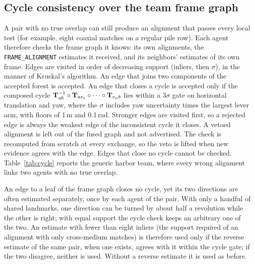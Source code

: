 \subsection{Cycle consistency over the team frame graph}
A pair with no true overlap can still produce an alignment that passes every local test
(for example, eight coaxial matches on a regular pile row). Each agent therefore checks the frame graph it knows:
its own alignments, the \texttt{FRAME\_ALIGNMENT} estimates it received, and its neighbors'
estimates of its own frame. Edges are visited in order of decreasing support (inliers, then
$\sigma$), in the manner of Kruskal's algorithm. An edge that joins two components of the accepted forest is accepted.
An edge that closes a cycle is accepted only if the composed cycle
$\mathbf{T}_{ab}^{-1}\circ\mathbf{T}_{ac_1}\circ\cdots\circ\mathbf{T}_{c_nb}$ lies within a $3\sigma$ gate on
horizontal translation and yaw, where the $\sigma$ includes yaw uncertainty times the largest lever arm, with floors of
1\,m and 0.1\,rad. Stronger edges are visited first, so a rejected edge is always the weakest edge of the
inconsistent cycle it closes. A vetoed alignment is left out of the fused graph and not advertised. The check is
recomputed from scratch at every exchange, so the veto is lifted when new evidence agrees with
the edge. Edges that close no cycle cannot be checked. Table~\ref{tab:cycle} reports the
generic harbor team, where every wrong alignment links two agents with no true overlap.

An edge to a leaf of the frame graph closes no cycle, yet its two directions are often estimated
separately, once by each agent of the pair. With only a handful of shared landmarks, one direction
can be turned by about half a revolution while the other is right; with equal support the
cycle check keeps an arbitrary one of the two. An estimate with fewer than eight inliers (the
support required of an alignment with only cross-medium matches) is therefore used only if the
reverse estimate of the same pair, when one exists, agrees with it within the cycle gate; if
the two disagree, neither is used. Without a reverse estimate it is used as before.

\begin{table}[t]
  \centering
  \caption{One-shot all-to-all association after 90\,s of solo mapping (harbor, five agents,
  unlimited links, Tier-1 simulation), before and after the cycle check.}
  \label{tab:cycle}
  \footnotesize
\end{table}
